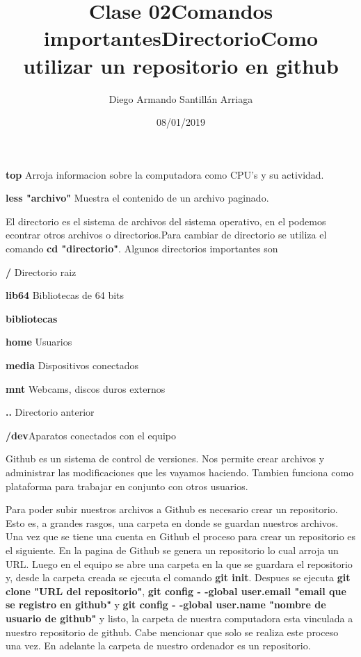 \documentclass[letter paper, 12pt, oneside]{article}
\title{\Huge Clase 02}
\author{Diego Armando Santillán Arriaga}
\date{08/01/2019}
\begin{document}
	\maketitle
\newpage
\title{\huge\textbf{Comandos importantes}}

\textbf{top} Arroja informacion sobre la computadora como CPU's y su actividad.

\textbf{less "archivo"} Muestra el contenido de un archivo paginado.


\title{\huge\textbf{Directorio}}


El directorio es el sistema de archivos del sistema operativo, en el podemos econtrar otros archivos o directorios.Para cambiar de directorio se utiliza el comando \textbf{cd "directorio"}. Algunos directorios importantes son

\textbf{/} Directorio raiz


\textbf{lib64} Bibliotecas de 64 bits


\textbf{bibliotecas}


\textbf{home} Usuarios


\textbf{media} Dispositivos conectados


\textbf{mnt} Webcams, discos duros externos


\textbf{..} Directorio anterior


\textbf{/dev}Aparatos conectados con el equipo

\title{\huge\textbf{Como utilizar un repositorio en github}}


Github es un sistema de control de versiones. Nos permite crear archivos y administrar las modificaciones que les vayamos haciendo. Tambien funciona como plataforma para trabajar en conjunto con otros usuarios.

Para poder subir nuestros archivos a Github es necesario crear un repositorio. Esto es, a grandes rasgos, una carpeta en donde se guardan nuestros archivos. Una vez que se tiene una cuenta en Github el proceso para crear un repositorio es el siguiente. En la pagina de Github se genera un repositorio lo cual arroja un URL. Luego en el equipo se abre una carpeta en la que se guardara el repositorio y, desde la carpeta creada se ejecuta el comando \textbf{git init}. Despues se ejecuta \textbf{git clone "URL del repositorio"}, \textbf{git config - -global user.email "email que se registro en github"} y \textbf{git config - -global user.name "nombre de usuario de github"} y listo, la carpeta de nuestra computadora esta vinculada a nuestro repositorio de github. Cabe mencionar que solo se realiza este proceso una vez. En adelante la carpeta de nuestro ordenador es un repositorio.  
\end{document}
